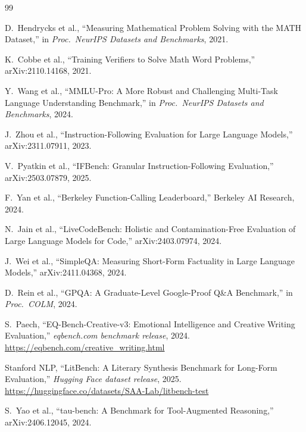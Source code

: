 \documentclass[twocolumn,10pt,a4paper]{article}
\begin{document}
\begingroup
\footnotesize\selectfont
\begin{thebibliography}{99}
\setlength{\itemsep}{2pt}
\setlength{\parsep}{0pt}
\setlength{\topsep}{0pt}
\setlength{\parskip}{0pt}

D.~Hendrycks et al., ``Measuring Mathematical Problem Solving with the MATH Dataset,''
in \emph{Proc.\ NeurIPS Datasets and Benchmarks}, 2021.

K.~Cobbe et al., ``Training Verifiers to Solve Math Word Problems,''
arXiv:2110.14168, 2021.

Y.~Wang et al., ``MMLU-Pro: A More Robust and Challenging Multi-Task Language Understanding Benchmark,''
in \emph{Proc.\ NeurIPS Datasets and Benchmarks}, 2024.

J.~Zhou et al., ``Instruction-Following Evaluation for Large Language Models,''
arXiv:2311.07911, 2023.

V.~Pyatkin et al., ``IFBench: Granular Instruction-Following Evaluation,''
arXiv:2503.07879, 2025.

F.~Yan et al., ``Berkeley Function-Calling Leaderboard,''
Berkeley AI Research, 2024.

N.~Jain et al., ``LiveCodeBench: Holistic and Contamination-Free Evaluation of Large Language Models for Code,''
arXiv:2403.07974, 2024.

J.~Wei et al., ``SimpleQA: Measuring Short-Form Factuality in Large Language Models,''
arXiv:2411.04368, 2024.

D.~Rein et al., ``GPQA: A Graduate-Level Google-Proof Q\&A Benchmark,''
in \emph{Proc.\ COLM}, 2024.

S.~Paech, ``EQ-Bench-Creative-v3: Emotional Intelligence and Creative Writing Evaluation,'' \emph{eqbench.com benchmark release}, 2024. \url{https://eqbench.com/creative_writing.html}

Stanford NLP, ``LitBench: A Literary Synthesis Benchmark for Long-Form Evaluation,'' \emph{Hugging Face dataset release}, 2025. \url{https://huggingface.co/datasets/SAA-Lab/litbench-test}

S.~Yao et al., ``tau-bench: A Benchmark for Tool-Augmented Reasoning,''
arXiv:2406.12045, 2024.


\end{thebibliography}
\end{document}

